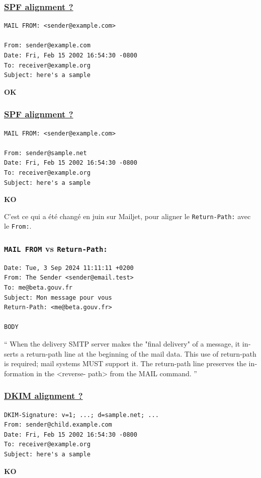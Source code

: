 \documentclass{beamer}
\begin{document}
\begin{frame}[fragile]
    \frametitle{\href{https://datatracker.ietf.org/doc/html/rfc7489\#appendix-B.1.1}{SPF alignment ?}}

    \begin{verbatim}
MAIL FROM: <sender@example.com>

From: sender@example.com
Date: Fri, Feb 15 2002 16:54:30 -0800
To: receiver@example.org
Subject: here's a sample
    \end{verbatim}
    \pause
    \textbf{OK}
\end{frame}

\begin{frame}[fragile]
    \frametitle{\href{https://datatracker.ietf.org/doc/html/rfc7489\#appendix-B.1.1}{SPF alignment ?}}

    \begin{verbatim}
MAIL FROM: <sender@example.com>

From: sender@sample.net
Date: Fri, Feb 15 2002 16:54:30 -0800
To: receiver@example.org
Subject: here's a sample
    \end{verbatim}
    \pause
    \textbf{KO}

    \Rightarrow \hspace{5pt} C'est ce qui a été changé en juin sur Mailjet, pour aligner le \texttt{Return-Path:} avec le \texttt{From:}.
\end{frame}

\begin{frame}[fragile]
    \frametitle{\texttt{MAIL FROM} vs \texttt{Return-Path:}}

    \begin{verbatim}
Date: Tue, 3 Sep 2024 11:11:11 +0200
From: The Sender <sender@email.test>
To: me@beta.gouv.fr
Subject: Mon message pour vous
Return-Path: <me@beta.gouv.fr>

BODY
    \end{verbatim}
    \pause
    \foreignquote{english}{
        When the delivery SMTP server makes the "final delivery" of a message,
        it inserts a return-path line at the beginning of the mail data. This
        use of return-path is required; mail systems MUST support it. The
        return-path line preserves the information in the <reverse- path> from
        the MAIL command.
    }
\end{frame}

\begin{frame}[fragile]
    \frametitle{\href{https://datatracker.ietf.org/doc/html/rfc7489\#appendix-B.1.2}{DKIM alignment ?}}

    \begin{verbatim}
DKIM-Signature: v=1; ...; d=sample.net; ...
From: sender@child.example.com
Date: Fri, Feb 15 2002 16:54:30 -0800
To: receiver@example.org
Subject: here's a sample
    \end{verbatim}
    \pause
    \textbf{KO}
\end{frame}
\end{document}
